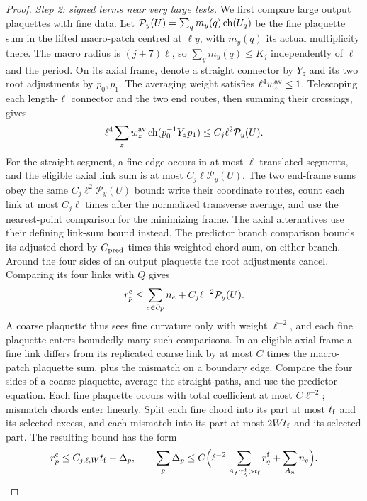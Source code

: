 \begin{proof}
\emph{Step 2: signed terms near very large tests.} We first compare large output plaquettes with fine data. Let $\mathcal P_y(U)=\sum_qm_y(q)\operatorname{ch}(U_q)$ be the fine plaquette sum in the lifted macro-patch centred at $\ell y$, with $m_y(q)$ its actual multiplicity there. The macro radius is $(j+7)\ell$, so $\sum_y m_y(q)\le K_j$ independently of $\ell$ and the period. On its axial frame, denote a straight connector by $Y_z$ and its two root adjustments by $p_0,p_1$. The averaging weight satisfies $\ell^4w_z^{\rm av}\le1$. Telescoping each length-$\ell$ connector and the two end routes, then summing their crossings, gives
\begin{equation*}
\ell^4\sum_z w_z^{\rm av}\operatorname{ch}(p_0^{-1}Y_zp_1)
\le C_j\ell^2\mathcal P_y(U).
\end{equation*}
For the straight segment, a fine edge occurs in at most $\ell$ translated segments, and the eligible axial link sum is at most $C_j\ell\mathcal P_y(U)$. The two end-frame sums obey the same $C_j\ell^2\mathcal P_y(U)$ bound: write their coordinate routes, count each link at most $C_j\ell$ times after the normalized transverse average, and use the nearest-point comparison for the minimizing frame. The axial alternatives use their defining link-sum bound instead. The predictor branch comparison bounds its adjusted chord by $C_{\rm pred}$ times this weighted chord sum, on either branch. Around the four sides of an output plaquette the root adjustments cancel. Comparing its four links with $Q$ gives
\begin{equation*}
r^{\rm c}_p\le\sum_{e\in\partial p}n_e+C_j\ell^{-2}\mathcal P_y(U).
\end{equation*}
A coarse plaquette thus sees fine curvature only with weight $\ell^{-2}$, and each fine plaquette enters boundedly many such comparisons. In an eligible axial frame a fine link differs from its replicated coarse link by at most $C$ times the macro-patch plaquette sum, plus the mismatch on a boundary edge. Compare the four sides of a coarse plaquette, average the straight paths, and use the predictor equation. Each fine plaquette occurs with total coefficient at most $C\ell^{-2}$; mismatch chords enter linearly. Split each fine chord into its part at most $t_{\rm f}$ and its selected excess, and each mismatch into its part at most $2Wt_{\rm f}$ and its selected part. The resulting bound has the form
\begin{equation*}
r^{\rm c}_p\le C_{j,\ell,W}t_{\rm f}+\Delta_p,\qquad
\sum_p\Delta_p\le C\Bigl(\ell^{-2}\sum_{A_f:r^{\rm f}_q>t_{\rm f}}r^{\rm f}_q+\sum_{A_n}n_e\Bigr).

\end{equation*}
\end{proof}
